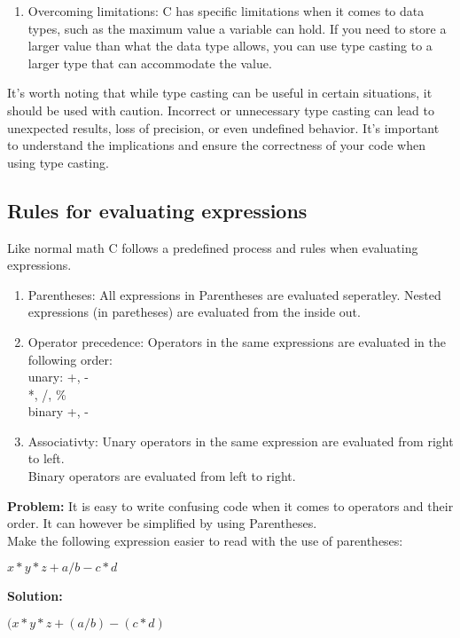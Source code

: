 \documentclass[12pt, letterpaper]{report}
\newcommand{\problem}[1]{%
    \begin{tcolorbox}[colback=white,colframe=black]
        \textbf{Problem:} #1
    \end{tcolorbox}
}
\newcommand{\solution}[1]{%
    \begin{tcolorbox}[colback=white,colframe=gray]
        \textbf{Solution:} #1
    \end{tcolorbox}
}
\begin{document}
\begin{tcolorbox}[colback=white,colframe=gray]
\begin{enumerate}
		\item Overcoming limitations: C has specific limitations when it comes 
			to data types, such as the maximum value a variable can hold. If 
			you need to store a larger value than what the data type allows, 
			you can use type casting to a larger type that can accommodate the 
			value.
	\end{enumerate}
It's worth noting that while type casting can be useful in certain situations, 
it should be used with caution. Incorrect or unnecessary type casting can lead 
to unexpected results, loss of precision, or even undefined behavior. It's 
important to understand the implications and ensure the correctness of your 
code when using type casting.
\end{tcolorbox}

\subsection{Rules for evaluating expressions}
Like normal math C follows a predefined process and rules when evaluating expressions.
\begin{enumerate}
	\item Parentheses: All expressions in Parentheses are evaluated seperatley. 
		Nested expressions (in paretheses) are evaluated from the inside out.
	\item Operator precedence: Operators in the same expressions are evaluated 
		in the following order:\\
		unary: +, -\\
		*, /, \%\\
		binary +, -
	\item Associativty: Unary operators in the same expression are evaluated 
		from right to left.\\
		Binary operators are evaluated from left to right.
\end{enumerate}

\problem{It is easy to write confusing code when it comes to operators and their 
	order. It can however be simplified by using Parentheses. \\
	Make the following expression easier to read with the use of parentheses:\\
\begin{center} $ x * y * z + a / b - c * d $ \end{center} }

\solution{ \begin{center} $ (x * y * z + ( a / b ) - (c * d) $ \end{center} }
\end{document}
